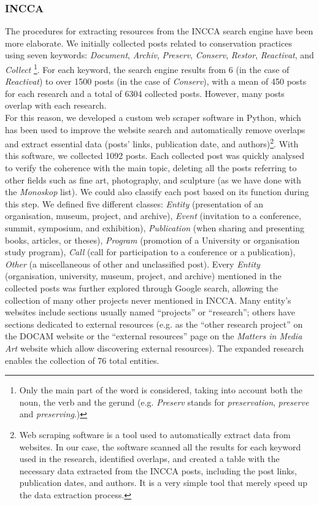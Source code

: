 \subsubsection*{INCCA}
The procedures for extracting resources from the INCCA search engine have been more elaborate. We initially collected posts related to conservation practices using seven keywords: \textit{Document}, \textit{Archiv}, \textit{Preserv}, \textit{Conserv}, \textit{Restor}, \textit{Reactivat}, and \textit{Collect}
\footnote{Only the main part of the word is considered, taking into account both the noun, the verb and the gerund (e.g. \textit{Preserv} stands for \textit{preservation}, \textit{preserve} and \textit{preserving}.)
}.
 For each keyword, the search engine results from 6 (in the case of \textit{Reactivat}) to over 1500 posts (in the case of \textit{Conserv}), with a mean of 450 posts for each research and a total of 6304 collected posts. However, many posts overlap with each research.\\
For this reason, we developed a custom web scraper software in Python, which has been used to improve the website search and automatically remove overlaps and extract essential data (posts’ links, publication date, and authors)\footnote{Web scraping software is a tool used to automatically extract data from websites. In our case, the software scanned all the results for each keyword used in the research, identified overlaps, and created a table with the necessary data extracted from the INCCA posts, including the post links, publication dates, and authors. It is a very simple tool that merely speed up the data extraction process.}. With this software, we collected 1092 posts. Each collected post was quickly analysed to verify the coherence with the main topic, deleting all the posts referring to other fields such as fine art, photography, and sculpture (as we have done with the \textit{Monoskop} list). We could also classify each post based on its function during this step. We defined five different classes: \textit{Entity} (presentation of an organisation, museum, project, and archive), \textit{Event} (invitation to a conference, summit, symposium, and exhibition), \textit{Publication} (when sharing and presenting books, articles, or theses), \textit{Program} (promotion of a University or organisation study program), \textit{Call} (call for participation to a conference or a publication), \textit{Other} (a miscellaneous of other and unclassified post). Every \textit{Entity} (organisation, university, museum, project, and archive) mentioned in the collected posts was further explored through Google search, allowing the collection of many other projects never mentioned in INCCA. Many entity's websites include sections usually named ``projects'' or ``research''; others have sections dedicated to external resources (e.g. as the ``other research project'' on the DOCAM website or the ``external resources'' page on the \textit{Matters in Media Art} website which allow discovering external resources). The expanded research enables the collection of 76 total entities.\\
